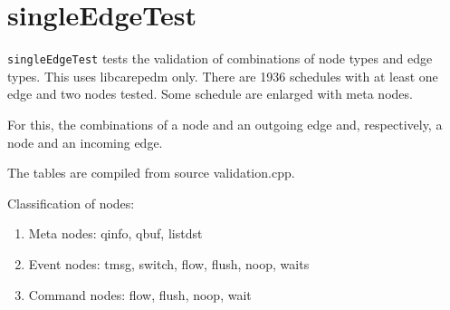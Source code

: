 \section{singleEdgeTest}
\texttt{singleEdgeTest} tests the validation of combinations of node types and edge types. This uses libcarepedm only. There are 1936 schedules
with at least one edge and two nodes tested. Some schedule are enlarged with meta nodes.

For this, the combinations of a node and an outgoing edge and,
respectively, a node and an incoming edge.

The tables are compiled from source validation.cpp.

Classification of nodes:
\begin{enumerate}
\item Meta nodes: qinfo, qbuf, listdst
\item Event nodes: tmsg, switch, flow, flush, noop, waits
\item Command nodes: flow, flush, noop, wait
\end{enumerate}

